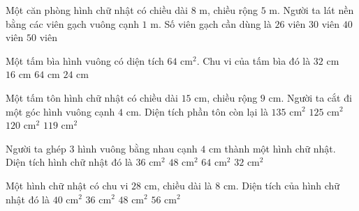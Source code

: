 \begin{ex} %
Một căn phòng hình chữ nhật có chiều dài $8\text{ m}$, chiều rộng $5\text{ m}$. Người ta lát nền bằng các viên gạch vuông cạnh $1\text{ m}$. Số viên gạch cần dùng là
\choice
{$26$ viên}
{$30$ viên}
{\True $40$ viên}
{$50$ viên}
\end{ex}

\begin{ex} %
Một tấm bìa hình vuông có diện tích $64\text{ cm}^2$. Chu vi của tấm bìa đó là
\choice
{\True $32\text{ cm}$}
{$16\text{ cm}$}
{$64\text{ cm}$}
{$24\text{ cm}$}
\end{ex}

\begin{ex} %
Một tấm tôn hình chữ nhật có chiều dài $15\text{ cm}$, chiều rộng $9\text{ cm}$. Người ta cắt đi một góc hình vuông cạnh $4\text{ cm}$. Diện tích phần tôn còn lại là
\choice
{$135\text{ cm}^2$}
{$125\text{ cm}^2$}
{$120\text{ cm}^2$}
{\True $119\text{ cm}^2$}
\end{ex}

\begin{ex} %
Người ta ghép 3 hình vuông bằng nhau cạnh $4\text{ cm}$ thành một hình chữ nhật. Diện tích hình chữ nhật đó là
\choice
{$36\text{ cm}^2$}
{\True $48\text{ cm}^2$}
{$64\text{ cm}^2$}
{$32\text{ cm}^2$}
\end{ex}

\begin{ex} %
Một hình chữ nhật có chu vi $28\text{ cm}$, chiều dài là $8\text{ cm}$. Diện tích của hình chữ nhật đó là
\choice
{$40\text{ cm}^2$}
{$36\text{ cm}^2$}
{\True $48\text{ cm}^2$}
{$56\text{ cm}^2$}
\end{ex}


